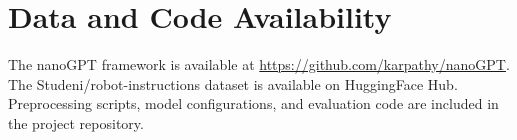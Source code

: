\documentclass[11pt,a4paper]{article}
\begin{document}
\section*{Data and Code Availability}

The nanoGPT framework is available at \url{https://github.com/karpathy/nanoGPT}.
The Studeni/robot-instructions dataset is available on HuggingFace Hub.
Preprocessing scripts, model configurations, and evaluation code are included in the project repository.
\end{document}
